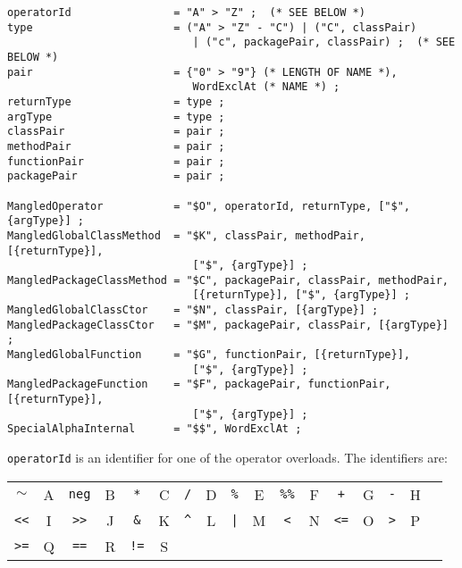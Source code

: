 \documentclass{article}
\begin{document}
\begin{verbatim}
operatorId                = "A" > "Z" ;  (* SEE BELOW *)
type                      = ("A" > "Z" - "C") | ("C", classPair)
                             | ("c", packagePair, classPair) ;  (* SEE BELOW *)
pair                      = {"0" > "9"} (* LENGTH OF NAME *),
                             WordExclAt (* NAME *) ;
returnType                = type ;
argType                   = type ;
classPair                 = pair ;
methodPair                = pair ;
functionPair              = pair ;
packagePair               = pair ;

MangledOperator           = "$O", operatorId, returnType, ["$", {argType}] ;
MangledGlobalClassMethod  = "$K", classPair, methodPair, [{returnType}],
                             ["$", {argType}] ;
MangledPackageClassMethod = "$C", packagePair, classPair, methodPair,
                             [{returnType}], ["$", {argType}] ;
MangledGlobalClassCtor    = "$N", classPair, [{argType}] ;
MangledPackageClassCtor   = "$M", packagePair, classPair, [{argType}] ;
MangledGlobalFunction     = "$G", functionPair, [{returnType}],
                             ["$", {argType}] ;
MangledPackageFunction    = "$F", packagePair, functionPair, [{returnType}],
                             ["$", {argType}] ;
SpecialAlphaInternal      = "$$", WordExclAt ;
\end{verbatim}

\texttt{operatorId} is an identifier for one of the operator overloads. The
identifiers are:
\newcommand{\QQ}[2]{\texttt{#1} & #2 &}
\begin{center}
\begin{tabular}{|cc|cc|cc|cc|cc|cc|cc|cc|l}
\cline{1-16}
\QQ{$\sim$}{A}  \QQ{neg}{B} \QQ{*}{C}  \QQ{/}{D}  \QQ{\%}{E}  \QQ{\%\%}{F}  \QQ{+}{G}  \QQ{-}{H} \\
\QQ{<<}{I}      \QQ{>>}{J}  \QQ{\&}{K} \QQ{\^}{L} \QQ{|}{M}   \QQ{<}{N}     \QQ{<=}{O} \QQ{>}{P} \\
\QQ{>=}{Q}      \QQ{==}{R}  \QQ{!=}{S} &&&&&&&&&& \\
\cline{1-16}
\end{tabular}
\end{center}
\end{document}
